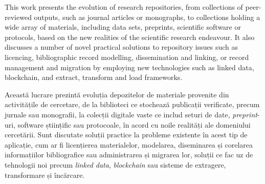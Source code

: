 This work presents the evolution of research repositories, from collections of peer-reviewed outputs, such as journal articles or monographs, to collections holding a wide array of materials, including data sets, preprints, scientific software or protocols, based on the new realities of the scientific research endeavour. It also discusses a number of novel practical solutions to repository issues such as licencing, bibliographic record modelling, dissemination and linking, or record management and migration by employing new technologies such as linked data, blockchain, and extract, transform and load frameworks.\\\par


Această lucrare prezintă evoluția depozitelor de materiale provenite din activitățile de cercetare, de la biblioteci ce stochează publicații verificate, precum jurnale sau monografii, la colecții digitale vaste ce includ seturi de date, \emph{preprint}-uri, software științific sau protocoale, în acord cu noile realități ale domeniului cercetării. Sunt discutate soluții practice la probleme existente în acest tip de aplicație, cum ar fi licențierea materialelor, modelarea, diseminarea și corelarea informațiilor bibliografice sau administrarea și migrarea lor, soluții ce fac uz de tehnologii noi precum \emph{linked data}, \emph{blockchain} sau sisteme de extragere, transformare și încărcare.  